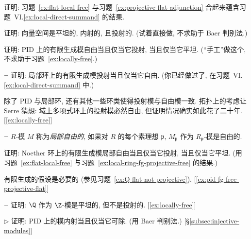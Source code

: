 \begin{prob}\label{ex:local-fg-projective-flat}
证明: 习题~\ref{ex:flat-local-free} 与习题~\ref{ex:projective-flat-adjunction} 合起来蕴含习题~VI.\ref{ex:local-direct-summand} 的结果.
\end{prob}

\begin{prob}\label{ex:vect-flat-injective-projective}
证明: 向量空间是平坦的, 内射的, 且投射的. (试着直接做, 不求助于 Baer 判别法.)
\end{prob}

\begin{prob}\label{ex:pid-fg-free-projective-flat}
证明: PID 上的有限生成模自由当且仅当它投射, 当且仅当它平坦. (``手工''做这个, 不求助于习题~\ref{ex:locally-free}.)
\end{prob}

\begin{prob}\label{ex:local-ring-fg-projective-free}
$\neg$ 证明: 局部环上的有限生成模投射当且仅当它自由. (你已经做过了, 在习题~VI.\ref{ex:local-direct-summand} 中.)

除了 PID 与局部环, 还有其他一些环类使得投射模与自由模一致. 拓扑上的考虑让 Serre 猜想: 域上多项式环上的投射模必然自由, 但证明情况确实如此花了二十年. [\ref{ex:locally-free}]
\end{prob}

\begin{prob}\label{ex:locally-free}
$\neg$ $R$-模 $M$ 称为\emph{局部自由的}, 如果对 $R$ 的每个素理想 $\mathfrak{p}$, $M_{\mathfrak{p}}$ 作为 $R_{\mathfrak{p}}$-模是自由的.

证明: Noether 环上的有限生成模局部自由当且仅当它投射, 当且仅当它平坦. (用习题~\ref{ex:flat-local-free} 与习题~\ref{ex:local-ring-fg-projective-free} 的结果.)

有限生成的假设是必要的 (参见习题~\ref{ex:Q-flat-not-projective}). [\ref{ex:pid-fg-free-projective-flat}]
\end{prob}

\begin{prob}\label{ex:Q-flat-not-projective}
$\neg$ 证明: $\Q$ 作为 $\Z$-模是平坦的, 但不是投射的. [\ref{ex:locally-free}]
\end{prob}

\begin{prob}\label{ex:divisible-injective-pid}
$\triangleright$ 证明: PID 上的模内射当且仅当它可除. (用 Baer 判别法.) [\S\ref{subsec:injective-modules}]
\end{prob}

